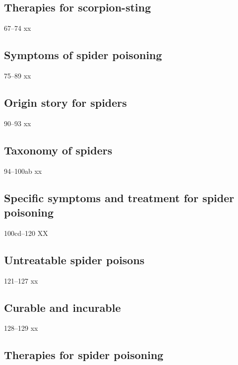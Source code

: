\begin{translation}
 \subsection{Therapies for scorpion-sting}
 
 \item[67--74] xx
 
 \subsection{Symptoms of spider poisoning}
 
 \item[75--89] xx
 
 \subsection{Origin story for spiders}
 
 \item[90--93] xx
 
 \subsection{Taxonomy of spiders}
 
 \item[94--100ab] xx
 
 \subsection{Specific symptoms and treatment for spider poisoning}
 
 \item[100cd--120] XX
 
 \subsection{Untreatable spider poisons}
 
 \item [121--127] xx
 
 \subsection{Curable and incurable}
 
 \item[128--129] xx
 
 \subsection{Therapies for spider poisoning}
 

\end{translation}
